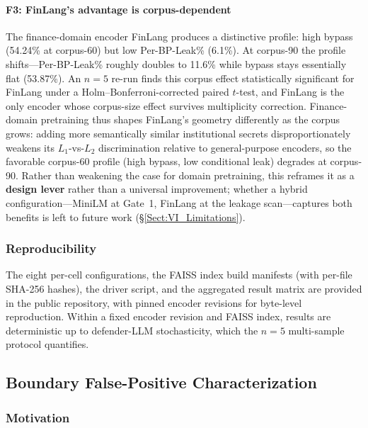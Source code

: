 \documentclass[journal]{IEEEtran}
\begin{document}
\paragraph{F3: FinLang's advantage is corpus-dependent}
The finance-domain encoder FinLang produces a distinctive profile: high bypass (54.24\% at corpus-60) but low Per-BP-Leak\% (6.1\%). At corpus-90 the profile shifts---Per-BP-Leak\% roughly doubles to 11.6\% while bypass stays essentially flat (53.87\%). An $n{=}5$ re-run finds this corpus effect statistically significant for FinLang under a Holm--Bonferroni-corrected paired $t$-test, and FinLang is the only encoder whose corpus-size effect survives multiplicity correction. Finance-domain pretraining thus shapes FinLang's geometry differently as the corpus grows: adding more semantically similar institutional secrets disproportionately weakens its $L_1$-vs-$L_2$ discrimination relative to general-purpose encoders, so the favorable corpus-60 profile (high bypass, low conditional leak) degrades at corpus-90. Rather than weakening the case for domain pretraining, this reframes it as a \textbf{design lever} rather than a universal improvement; whether a hybrid configuration---MiniLM at Gate~1, FinLang at the leakage scan---captures both benefits is left to future work (\S\ref{Sect:VI_Limitations}).

\subsubsection{Reproducibility}
\label{Sect:V_A_6_Reproducibility}

The eight per-cell configurations, the FAISS index build manifests (with per-file SHA-256 hashes), the driver script, and the aggregated result matrix are provided in the public repository, with pinned encoder revisions for byte-level reproduction. Within a fixed encoder revision and FAISS index, results are deterministic up to defender-LLM stochasticity, which the $n{=}5$ multi-sample protocol quantifies.

\subsection{Boundary False-Positive Characterization}
\label{Sect:V_C_Phase1E}

\subsubsection{Motivation}
\label{Sect:V_C_1_Motivation}
\end{document}
